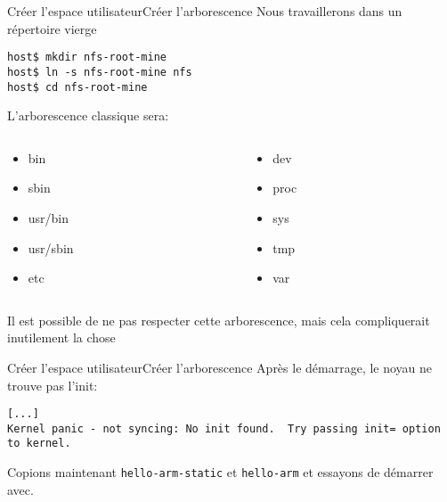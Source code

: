 \begin{frame}[fragile=singleslide]{Créer l'espace utilisateur}{Créer l'arborescence}
  Nous travaillerons dans un répertoire vierge
  \begin{lstlisting}
host$ mkdir nfs-root-mine
host$ ln -s nfs-root-mine nfs
host$ cd nfs-root-mine
  \end{lstlisting} %
  L'arborescence classique sera:
  \vspace{-2ex}
  \begin{columns}[onlytextwidth,t]
    \begin{column}[t]{0.5\textwidth}
      \begin{itemize}
      \item bin
      \item sbin
      \item usr/bin
      \item usr/sbin
      \item etc
      \end{itemize}
    \end{column}
    \begin{column}[t]{0.5\textwidth}
      \begin{itemize}
      \item dev
      \item proc
      \item sys
      \item tmp
      \item var
      \end{itemize}
    \end{column}
  \end{columns}
  \vspace{2ex}
  Il est possible de ne pas respecter cette arborescence, mais cela
  compliquerait inutilement la chose
\end{frame}

\begin{frame}[fragile=singleslide]{Créer l'espace utilisateur}{Créer l'arborescence}
  Après le démarrage, le noyau ne trouve pas l'init:
    \begin{lstlisting}
[...]
Kernel panic - not syncing: No init found.  Try passing init= option to kernel.
    \end{lstlisting}

    Copions maintenant  \verb+hello-arm-static+ et \verb+hello-arm+ et
    essayons de démarrer avec.
\end{frame}


